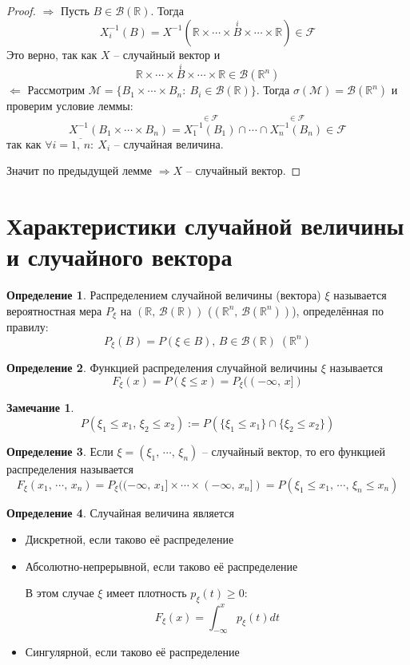 \documentclass[a4paper,12pt]{article}
\renewcommand{\leq}{\ensuremath{\leqslant}}
\renewcommand{\geq}{\ensuremath{\geqslant}}
\theoremstyle{plain}
\theoremstyle{definition}
\newtheorem{definition}{Определение}[section]
\newtheorem*{note}{Замечание}
\theoremstyle{remark}
\begin{document}
\begin{proof}
	$\Rightarrow$ Пусть $B \in \mathcal{B}(\mathbb{R})$. Тогда
	\[X_i^{-1}(B) = X^{-1}(\mathbb{R} \times\cdots\times \stackrel{i}{B}\times\cdots\times\mathbb{R}) \in \mathcal{F}\]
	Это верно, так как $X$ -- случайный вектор и
	\[\mathbb{R} \times\cdots\times \stackrel{i}{B}\times\cdots\times \mathbb{R} \in \mathcal{B}(\mathbb{R}^n)\]
	$\Leftarrow$ Рассмотрим $\mathcal{M} = \{B_1\times\cdots\times B_n :\: B_i \in \mathcal{B}(\mathbb{R})\}$. Тогда $\sigma(\mathcal{M}) = \mathcal{B}(\mathbb{R}^n)$ и проверим условие леммы:
	\[X^{-1}(B_1\times\cdots\times B_n) = \stackrel{\in \mathcal{F}}{X^{-1}_1(B_1)} \cap\cdots\cap \stackrel{\in \mathcal{F}}{X_n^{-1}(B_n)} \in \mathcal{F}\]
	так как $\forall i = \overline{1,\,n}:\: X_i$ -- случайная величина.

	Значит по предыдущей лемме $\Rightarrow X$ -- случайный вектор.
\end{proof}

\section{Характеристики случайной величины и случайного вектора}
\begin{definition}
	Распределением случайной величины (вектора) $\xi$ называется вероятностная мера $P_\xi$ на $(\mathbb{R},\,\mathcal{B}(\mathbb{R}))$ ($(\mathbb{R}^n,\,\mathcal{B}(\mathbb{R}^n))$), определённая по правилу:
	\[P_\xi(B) = P(\xi \in B),\, B \in \mathcal{B}(\mathbb{R}) \; (\mathbb{R}^n)\]
\end{definition}

\begin{definition}
	Функцией распределения случайной величины $\xi$ называется
	\[F_\xi(x) = P(\xi \leq x) = P_\xi((-\infty,\, x])\]
\end{definition}

\begin{note}
	\[P(\xi_1 \leq x_1,\, \xi_2 \leq x_2) := P(\{\xi_1 \leq x_1\} \cap \{\xi_2 \leq x_2\})\]
\end{note}

\begin{definition}
	Если $\xi = (\xi_1,\,\cdots,\,\xi_n)$ -- случайный вектор, то его функцией распределения называется
	\[F_\xi(x_1,\,\cdots,\,x_n) = P_\xi((-\infty,\,x_1]\times\cdots\times (-\infty,\,x_n]) = P(\xi_1 \leq x_1,\, \cdots,\, \xi_n \leq x_n)\]
\end{definition}

\begin{definition}
	Случайная величина является
	\begin{itemize}
		\item Дискретной, если таково её распределение
		\item Абсолютно-непрерывной, если таково её распределение

		      В этом случае $\xi$ имеет плотность $p_\xi(t) \geq 0$:
		      \[F_\xi(x) = \int_{-\infty}^x p_\xi(t)dt\]
		\item Сингулярной, если таково её распределение
	\end{itemize}
\end{definition}
\end{document}

